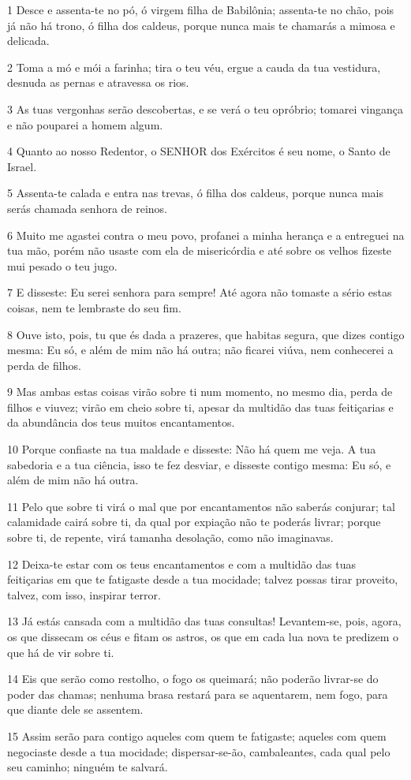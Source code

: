 \par 1 Desce e assenta-te no pó, ó virgem filha de Babilônia; assenta-te no chão, pois já não há trono, ó filha dos caldeus, porque nunca mais te chamarás a mimosa e delicada.
\par 2 Toma a mó e mói a farinha; tira o teu véu, ergue a cauda da tua vestidura, desnuda as pernas e atravessa os rios.
\par 3 As tuas vergonhas serão descobertas, e se verá o teu opróbrio; tomarei vingança e não pouparei a homem algum.
\par 4 Quanto ao nosso Redentor, o SENHOR dos Exércitos é seu nome, o Santo de Israel.
\par 5 Assenta-te calada e entra nas trevas, ó filha dos caldeus, porque nunca mais serás chamada senhora de reinos.
\par 6 Muito me agastei contra o meu povo, profanei a minha herança e a entreguei na tua mão, porém não usaste com ela de misericórdia e até sobre os velhos fizeste mui pesado o teu jugo.
\par 7 E disseste: Eu serei senhora para sempre! Até agora não tomaste a sério estas coisas, nem te lembraste do seu fim.
\par 8 Ouve isto, pois, tu que és dada a prazeres, que habitas segura, que dizes contigo mesma: Eu só, e além de mim não há outra; não ficarei viúva, nem conhecerei a perda de filhos.
\par 9 Mas ambas estas coisas virão sobre ti num momento, no mesmo dia, perda de filhos e viuvez; virão em cheio sobre ti, apesar da multidão das tuas feitiçarias e da abundância dos teus muitos encantamentos.
\par 10 Porque confiaste na tua maldade e disseste: Não há quem me veja. A tua sabedoria e a tua ciência, isso te fez desviar, e disseste contigo mesma: Eu só, e além de mim não há outra.
\par 11 Pelo que sobre ti virá o mal que por encantamentos não saberás conjurar; tal calamidade cairá sobre ti, da qual por expiação não te poderás livrar; porque sobre ti, de repente, virá tamanha desolação, como não imaginavas.
\par 12 Deixa-te estar com os teus encantamentos e com a multidão das tuas feitiçarias em que te fatigaste desde a tua mocidade; talvez possas tirar proveito, talvez, com isso, inspirar terror.
\par 13 Já estás cansada com a multidão das tuas consultas! Levantem-se, pois, agora, os que dissecam os céus e fitam os astros, os que em cada lua nova te predizem o que há de vir sobre ti.
\par 14 Eis que serão como restolho, o fogo os queimará; não poderão livrar-se do poder das chamas; nenhuma brasa restará para se aquentarem, nem fogo, para que diante dele se assentem.
\par 15 Assim serão para contigo aqueles com quem te fatigaste; aqueles com quem negociaste desde a tua mocidade; dispersar-se-ão, cambaleantes, cada qual pelo seu caminho; ninguém te salvará.


